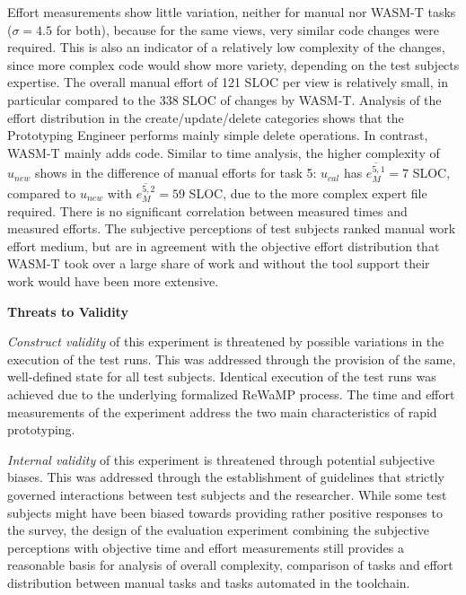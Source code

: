 Effort measurements show little variation, neither for manual nor WASM-T tasks (\(\sigma = 4.5\) for both), because for the same views, very similar code changes were required.
This is also an indicator of a relatively low complexity of the changes, since more complex code would show more variety, depending on the test subjects expertise.
The overall manual effort of 121 SLOC per view is relatively small, in particular compared to the 338 SLOC of changes by WASM-T.
Analysis of the effort distribution in the create/update/delete categories shows that the Prototyping Engineer performs mainly simple delete operations.
In contrast, WASM-T mainly adds code.
Similar to time analysis, the higher complexity of \(u_{new}\) shows in the difference of manual efforts for task 5: \(u_{cal}\) has \(\overline{e_M^{5,1}}=7\) SLOC, compared to \(u_{new}\) with \(\overline{e_M^{5,2}}=59\) SLOC, due to the more complex expert file required.
There is no significant correlation between measured times and measured efforts.
The subjective perceptions of test subjects ranked manual work effort medium, but are in agreement with the objective effort distribution that WASM-T took over a large share of work and without the tool support their work would have been more extensive.

\textbf{Threats to Validity}

\emph{Construct validity} of this experiment is threatened by possible variations in the execution of the test runs.
This was addressed through the provision of the same, well-defined state for all test subjects.
Identical execution of the test runs was achieved due to the underlying formalized ReWaMP process.
The time and effort measurements of the experiment address the two main characteristics of rapid prototyping.

\emph{Internal validity} of this experiment is threatened through potential subjective biases.
This was addressed through the establishment of guidelines that strictly governed interactions between test subjects and the researcher.
While some test subjects might have been biased towards providing rather positive responses to the survey, the design of the evaluation experiment combining the subjective perceptions with objective time and effort measurements still provides a reasonable basis for analysis of overall complexity, comparison of tasks and effort distribution between manual tasks and tasks automated in the toolchain.

